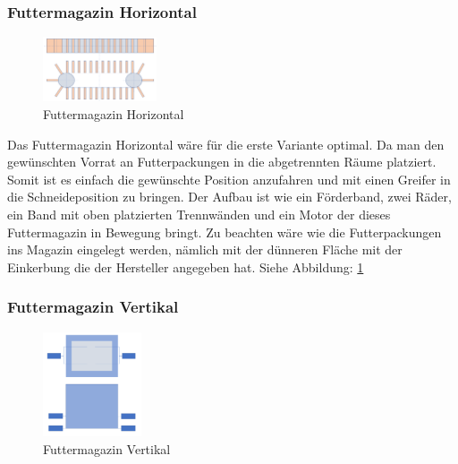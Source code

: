 \subsubsection{Futtermagazin Horizontal}

\begin{figure}
\vspace{-40pt}
  \begin{center}
    \includegraphics[width=0.30\textwidth]{Bilder/Powerpoint/Futtermagazin_horizontal}
  \end{center}
  \caption{Futtermagazin Horizontal}
  \label{Magazin Horizontal}
  \vspace{-10pt}
\end{figure} 

Das Futtermagazin Horizontal wäre für die erste Variante optimal. Da man den gewünschten Vorrat an Futterpackungen in die abgetrennten Räume platziert. Somit ist es einfach die gewünschte Position anzufahren und mit einen Greifer in die Schneideposition zu bringen. Der Aufbau ist wie ein Förderband, zwei Räder, ein Band mit oben platzierten Trennwänden und ein Motor der dieses Futtermagazin in Bewegung bringt. Zu beachten wäre wie die Futterpackungen ins Magazin eingelegt werden, nämlich mit der dünneren Fläche mit der Einkerbung die der Hersteller angegeben hat. Siehe Abbildung: \ref{Magazin Horizontal}
\newpage
\subsubsection{Futtermagazin Vertikal}

\begin{figure}
\vspace{-40pt}
  \begin{center}
    \includegraphics[width=0.26\textwidth]{Bilder/Powerpoint/Futtermagazin_vertikal}
  \end{center}
  \caption{Futtermagazin Vertikal}
  \label{Magazin Vertikal}
  \vspace{-10pt}
\end{figure}

